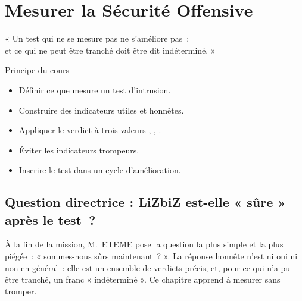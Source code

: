 
\chapter{Mesurer la Sécurité Offensive}
\label{chap:mesurer}

\epigraph{%
    « Un test qui ne se mesure pas ne s'améliore pas~;\\
    et ce qui ne peut être tranché doit être dit indéterminé. »%
}{Principe du cours}


\begin{boxobjectifs}
\begin{itemize}
    \item Définir ce que mesure un test d'intrusion.
    \item Construire des indicateurs utiles et honnêtes.
    \item Appliquer le verdict à trois valeurs , ,
          .
    \item Éviter les indicateurs trompeurs.
    \item Inscrire le test dans un cycle d'amélioration.
\end{itemize}
\end{boxobjectifs}

\bigskip

\section*{Question directrice : LiZbiZ est-elle « sûre » après le test~?}

À la fin de la mission, M.~ETEME pose la question la plus simple et la plus
piégée~: « sommes-nous sûrs maintenant~? ». La réponse honnête n'est ni oui
ni non en général~: elle est un ensemble de verdicts précis, et, pour ce qui
n'a pu être tranché, un franc « indéterminé ». Ce chapitre apprend à
mesurer sans tromper.

